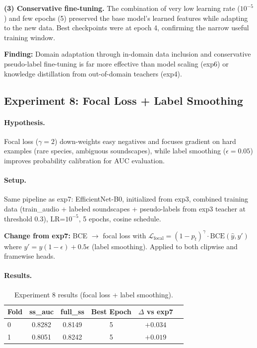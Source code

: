 \textbf{(3) Conservative fine-tuning.}
The combination of very low learning rate ($10^{-5}$) and few epochs (5)
preserved the base model's learned features while adapting to the new data.
Best checkpoints were at epoch 4, confirming the narrow useful training window.

\textbf{Finding:} Domain adaptation through in-domain data inclusion and
conservative pseudo-label fine-tuning is far more effective than model scaling
(exp6) or knowledge distillation from out-of-domain teachers (exp4).

\subsection{Experiment 8: Focal Loss + Label Smoothing}
\label{sec:exp8}

\paragraph{Hypothesis.}
Focal loss ($\gamma=2$) down-weights easy negatives and focuses gradient on
hard examples (rare species, ambiguous soundscapes), while label smoothing
($\epsilon=0.05$) improves probability calibration for AUC evaluation.

\paragraph{Setup.}
Same pipeline as exp7: EfficientNet-B0, initialized from exp3, combined
training data (train\_audio + labeled soundscapes + pseudo-labels from exp3
teacher at threshold 0.3), LR=$10^{-5}$, 5 epochs, cosine schedule.

\textbf{Change from exp7:} BCE $\to$ focal loss with
$\mathcal{L}_\text{focal} = (1-p_t)^\gamma \cdot \text{BCE}(\hat{y}, y')$
where $y' = y(1-\epsilon) + 0.5\epsilon$ (label smoothing).
Applied to both clipwise and framewise heads.

\paragraph{Results.}

\begin{table}[h]
\centering
\caption{Experiment 8 results (focal loss + label smoothing).}
\label{tab:exp8}
\begin{tabular}{lccccc}
\hline
\textbf{Fold} & \textbf{ss\_auc} & \textbf{full\_ss} & \textbf{Best Epoch} & \textbf{$\Delta$ vs exp7} \\
\hline
0 & 0.8282 & 0.8149 & 5 & $+0.034$ \\
1 & 0.8051 & 0.8242 & 5 & $+0.019$ \\
\hline
\end{tabular}
\end{table}

